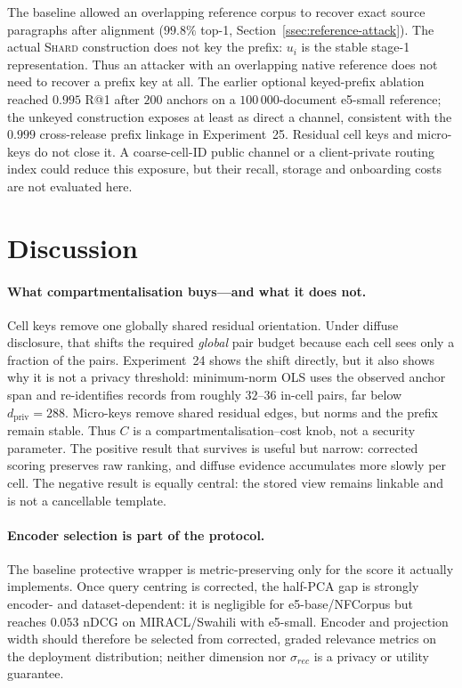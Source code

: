 The baseline allowed an overlapping reference corpus to recover exact
source paragraphs after alignment ($99.8\%$ top-1,
Section~\ref{ssec:reference-attack}). The actual \textsc{Shard} construction
does not key the prefix: $u_i$ is the stable stage-1 representation. Thus an
attacker with an overlapping native reference does not need to recover a
prefix key at all. The earlier optional keyed-prefix ablation reached
$0.995$ R@1 after $200$ anchors on a $100\,000$-document e5-small reference;
the unkeyed construction exposes at least as direct a channel, consistent
with the $0.999$ cross-release prefix linkage in Experiment~25. Residual
cell keys and micro-keys do not close it. A coarse-cell-ID public channel or
a client-private routing index could reduce this exposure, but their recall,
storage and onboarding costs are not evaluated here.

\FloatBarrier
\section{Discussion}\label{sec:discussion}

\paragraph{What compartmentalisation buys---and what it does not.} Cell keys
remove one globally shared residual orientation. Under diffuse disclosure,
that shifts the required \emph{global} pair budget because each cell sees
only a fraction of the pairs. Experiment~24 shows the shift directly, but it
also shows why it is not a privacy threshold: minimum-norm OLS uses the
observed anchor span and re-identifies records from roughly $32$--$36$
in-cell pairs, far below $d_{\mathrm{priv}}=288$. Micro-keys remove shared
residual edges, but norms and the prefix remain stable. Thus $C$ is a
compartmentalisation--cost knob, not a security parameter. The positive
result that survives is useful but narrow: corrected scoring preserves raw
ranking, and diffuse evidence accumulates more slowly per cell. The negative
result is equally central: the stored view remains linkable and is not a
cancellable template.

\paragraph{Encoder selection is part of the protocol.} The baseline
protective wrapper is metric-preserving only for the score it actually
implements. Once query centring is corrected, the half-PCA gap is strongly
encoder- and dataset-dependent: it is negligible for e5-base/NFCorpus but
reaches $0.053$ nDCG on MIRACL/Swahili with e5-small. Encoder and projection
width should therefore be selected from corrected, graded relevance metrics
on the deployment distribution; neither dimension nor $\sigma_{rec}$ is a
privacy or utility guarantee.

